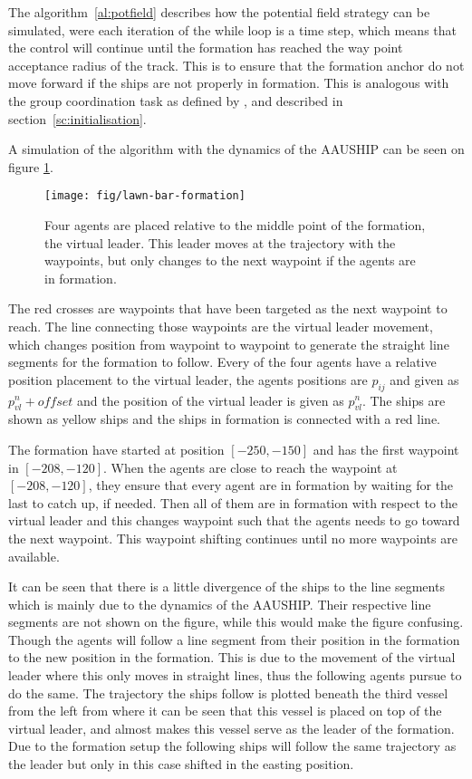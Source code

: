 The algorithm~\vref{al:potfield} describes how the potential field
strategy can be simulated, were each iteration of the while loop is a
time step, which means that the control will continue until the
formation has reached the way point acceptance radius of the track.
This is to ensure that the formation anchor do not move forward if the
ships are not properly in formation. This is analogous with the group
coordination task as defined by \citep{thorvaldsen}, and described in
section~\ref{sc:initialisation}.

A simulation of the algorithm with the dynamics of the AAUSHIP can be seen on figure \ref{fig:potform}.
\begin{figure}[htbp]
  \centering
  \texttt{[image: fig/lawn-bar-formation]}
  \caption{Four agents are placed relative to the middle point of the formation, the virtual leader. This leader moves at the trajectory with the waypoints, but only changes to the next waypoint if the agents are in formation.}
  \label{fig:potform}
\end{figure}
The red crosses are waypoints that have been targeted as the next waypoint to reach. The line connecting those waypoints are the virtual leader movement, which changes position from waypoint to waypoint to generate the straight line segments for the formation to follow. Every of the four agents have a relative position placement to the virtual leader, the agents positions are $p_{ij}$ and given as $p^n_{vl} + offset$ and the position of the virtual leader is given as $p^n_{vl}$. The ships are shown as yellow ships and the ships in formation is connected with a red line.

The formation have started at position $[-250,-150]$ and has the first waypoint in $[-208,-120]$. When the agents are close to reach the waypoint at $[-208,-120]$, they ensure that every agent are in formation by waiting for the last to catch up, if needed. Then all of them are in formation with respect to the virtual leader and this changes waypoint such that the agents needs to go toward the next waypoint. This waypoint shifting continues until no more waypoints are available.

It can be seen that there is a little divergence of the ships to the line segments which is mainly due to the dynamics of the AAUSHIP. Their respective line segments are not shown on the figure, while this would make the figure confusing. Though the agents will follow a line segment from their position in the formation to the new position in the formation. This is due to the movement of the virtual leader where this only moves in straight lines, thus the following agents pursue to do the same. The trajectory the ships follow is plotted beneath the third vessel from the left from where it can be seen that this vessel is placed on top of the virtual leader, and almost makes this vessel serve as the leader of the formation. Due to the formation setup the following ships will follow the same trajectory as the leader but only in this case shifted in the easting position.


